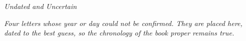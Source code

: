 
\cleardoublepage
\thispagestyle{laempty}
\vspace*{0.12\textheight}
\begin{center}
    \par
    \vspace{0.4em}
    \brassrule[36pt]\par
    \vspace{1.6em}
    {\Huge\displayfont\itshape Undated and Uncertain\par}
    \vspace{1.6em}
    \begin{minipage}{0.78\textwidth}
        \centering\displayfont\itshape\large\color{walnutsoft}
        Four letters whose year or day could not be confirmed.
        They are placed here, dated to the best guess, so the
        chronology of the book proper remains true.
    \end{minipage}
\end{center}
\vfill
\cleardoublepage


